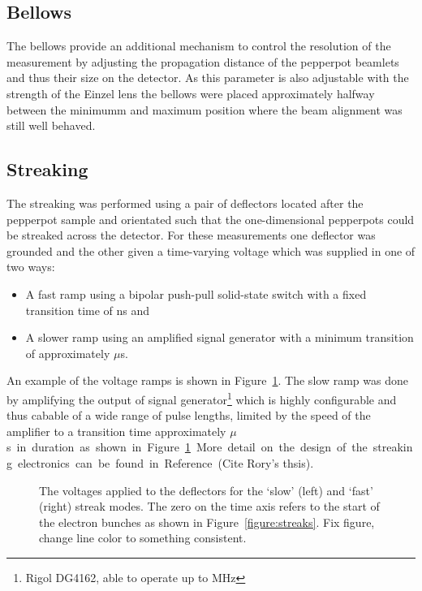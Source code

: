 \subsection{Bellows}

The bellows provide an additional mechanism to control the resolution of the measurement by adjusting the propagation distance of the pepperpot beamlets and thus their size on the detector.
As this parameter is also adjustable with the strength of the Einzel lens the bellows were placed approximately halfway between the minimumm and maximum position where the beam alignment was still well behaved.

\subsection{Streaking}
The streaking was performed using a pair of deflectors located after the pepperpot sample and orientated such that the one-dimensional pepperpots could be streaked across the detector.
For these measurements one deflector was grounded and the other given a time-varying voltage which was supplied in one of two ways:
\begin{itemize}
\item A fast ramp using a bipolar push-pull solid-state switch with a fixed transition time of \unit[10]{ns} and
\item A slower ramp using an amplified signal generator with a minimum transition of approximately \unit[10]{$\mu$s}.
\end{itemize}
An example of the voltage ramps is shown in Figure~\ref{figure:deflector_voltages}. The slow ramp was done by amplifying the output of signal generator\footnote{Rigol DG4162, able to operate up to \unit[160]{MHz}} which is highly configurable and thus cabable of a wide range of pulse lengths, limited by the speed of the amplifier to a transition time approximately \unit[10]{$\mu$s} in duration as shown in Figure~\ref{figure:deflector_voltages}.
More detail on the design of the streaking electronics can be found in Reference~{\color{red}(Cite Rory's thsis)}.

\begin{figure}
    \center
    
    \caption{The voltages applied to the deflectors for the `slow' (left) and `fast' (right) streak modes. The zero on the time axis refers to the start of the electron bunches as shown in Figure~\ref{figure:streaks}. {\color{red} Fix figure, change line color to something consistent.}}
    \label{figure:deflector_voltages}
\end{figure}

